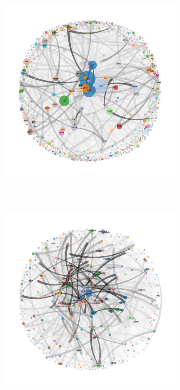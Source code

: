 \documentclass[varwidth, border=5pt]{standalone}
\begin{document}
\begin{figure}
\begin{subfigure}{0.5\linewidth}
\end{subfigure}
\hspace*{-0.025\linewidth}\begin{subfigure}{0.5\linewidth}
	\includegraphics[width=1.085\linewidth]{../../graphics/chapter-graph-2018-us.pdf}~%
\end{subfigure}~%
\begin{subfigure}{0.5\linewidth}
	\includegraphics[width=1.085\linewidth]{../../graphics/chapter-graph-2018-de.pdf}~%
\end{subfigure}
	\end{figure}
	
\end{document}
